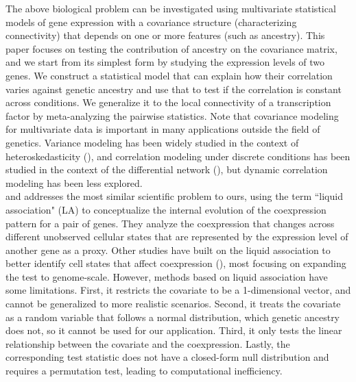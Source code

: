 \documentclass[aoas,authoryear, preprint]{imsart}
\numberwithin{equation}{section}
\theoremstyle{plain}
\begin{document}
The above biological problem can be investigated using multivariate statistical models of gene expression with a covariance structure (characterizing connectivity) that depends on one or more features (such as ancestry). This paper focuses on testing the contribution of ancestry on the covariance matrix, and we start from its simplest form by studying the expression levels of two genes. We construct a statistical model that can explain how their correlation varies against genetic ancestry and use that to test if the correlation is constant across conditions. We generalize it to the local connectivity of a transcription factor by meta-analyzing the pairwise statistics. Note that covariance modeling for multivariate data is important in many applications outside the field of genetics. Variance modeling has been widely studied in the context of heteroskedasticity (\cite{breusch1979simple, glejser1969new, white1980heteroskedasticity}), and correlation modeling under discrete conditions has been studied in the context of the differential network (\cite{ideker2012differential}), but dynamic correlation modeling has been less explored. \\

\cite{li2002genome} and \cite{li2004system} addresses the most similar scientific problem to ours, using the term ``liquid association" (LA) to conceptualize the internal evolution of the coexpression pattern for a pair of genes. They analyze the coexpression that changes across different unobserved cellular states that are represented by the expression level of another gene as a proxy. Other studies have built on the liquid association to better identify cell states that affect coexpression (\cite{yan2017detecting, yu2018new}), most focusing on expanding the test to genome-scale. However, methods based on liquid association have some limitations. First, it restricts the covariate to be a 1-dimensional vector, and cannot be generalized to more realistic scenarios. Second, it treats the covariate as a random variable that follows a normal distribution, which genetic ancestry does not, so it cannot be used for our application. Third, it only tests the linear relationship between the covariate and the coexpression. Lastly, the corresponding test statistic does not have a closed-form null distribution and requires a permutation test, leading to computational inefficiency. \\
\end{document}
